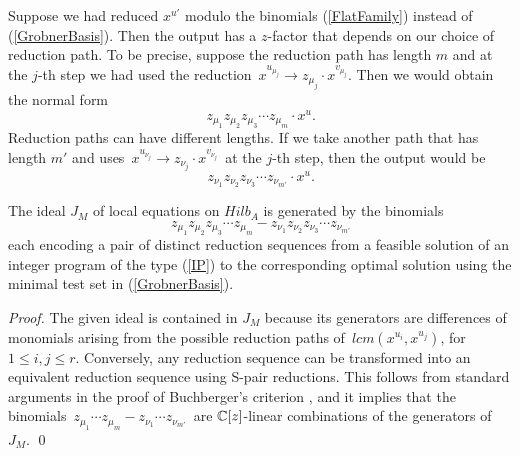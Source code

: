 Suppose we had reduced $x^{u'}$
modulo the binomials (\ref{FlatFamily}) instead of (\ref{GrobnerBasis}).
Then the output has a $z$-factor that depends on 
our choice of reduction path. To be precise, suppose the
reduction path has length $m$ and at the $j$-th step we had used the
reduction $\, x^{u_{\mu_j}} \rightarrow  z_{\mu_j} \cdot x^{v_{\mu_j}}
$. Then we would obtain the normal form
$$ \, z_{\mu_1} z_{\mu_2} z_{\mu_3} \cdots z_{\mu_m} \cdot x^u.$$
Reduction paths can have different lengths. If we take
another  path  that
has length $m'$ and  uses
$\, x^{u_{\nu_j}} \rightarrow  z_{\nu_j} \cdot x^{v_{\nu_j}} \,$
at the $j$-th step, then the output would be
$$ \, z_{\nu_1} z_{\nu_2} z_{\nu_3} \cdots z_{\nu_{m'}} \cdot x^u  .$$

\begin{theorem} \label{paths}
The ideal $J_M$ of local equations
on $Hilb_A$ is generated by the binomials
$$ \, z_{\mu_1} z_{\mu_2} z_{\mu_3} \cdots z_{\mu_m} - 
z_{\nu_1} z_{\nu_2} z_{\nu_3} \cdots z_{\nu_{m'}} $$ each encoding a
pair of distinct reduction sequences from a feasible solution of an
integer program of the type (\ref{IP}) to the corresponding optimal
solution using the minimal test set in (\ref{GrobnerBasis}).
\end{theorem}

\begin{proof}
The given ideal is contained in $J_M$ because its generators
are differences of monomials arising from the possible
reduction paths of $\,{lcm(x^{u_i},x^{u_j})} $,
for $1 \leq i,j \leq r $. Conversely, any reduction
sequence can be transformed into an equivalent reduction sequence
using S-pair reductions. This follows from standard
arguments in the proof of Buchberger's criterion
\cite[\S 2.6, Theorem 6]{HS:CLO}, and it implies that
the binomials  $ \, z_{\mu_1}  \cdots z_{\mu_m} -
 z_{\nu_1}  \cdots z_{\nu_{m'}}  \,$ are $\mathbb{C}[z]$-linear
combinations of the generators of $J_M$.
\qed
\end{proof}

